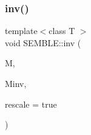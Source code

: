 \subsubsection{\texorpdfstring{inv()}{inv()}\hspace{0.1cm}{\footnotesize\ttfamily [1/2]}}
{\footnotesize\ttfamily template$<$class T $>$ \\
void S\+E\+M\+B\+L\+E\+::inv (\begin{DoxyParamCaption}\item[{const \mbox{\hyperlink{structSEMBLE_1_1SembleMatrix}{Semble\+Matrix}}$<$ T $>$ \&}]{M,  }\item[{\mbox{\hyperlink{structSEMBLE_1_1SembleMatrix}{Semble\+Matrix}}$<$ T $>$ \&}]{Minv,  }\item[{bool}]{rescale = {\ttfamily true} }\end{DoxyParamCaption})}

